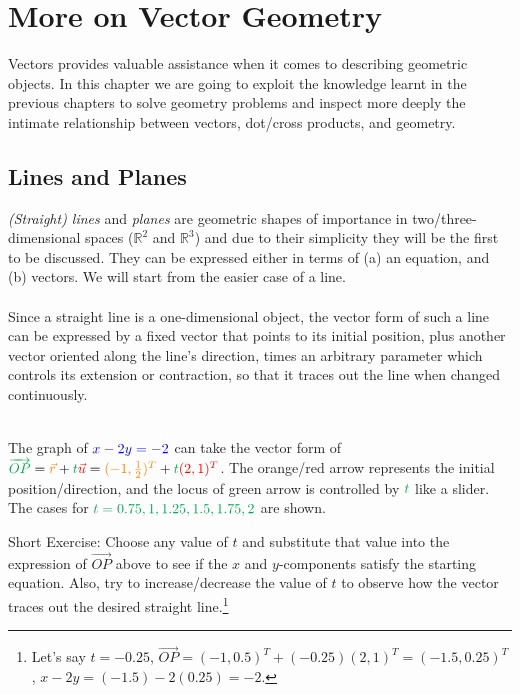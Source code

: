 \chapter{More on Vector Geometry}

Vectors provides valuable assistance when it comes to describing geometric objects. In this chapter we are going to exploit the knowledge learnt in the previous chapters to solve geometry problems and inspect more deeply the intimate relationship between vectors, dot/cross products, and geometry.

\section{Lines and Planes}
\textit{(Straight) lines} and \textit{planes} are geometric shapes of importance in two/three-dimensional spaces ($\mathbb{R}^2$ and $\mathbb{R}^3$) and due to their simplicity they will be the first to be discussed. They can be expressed either in terms of (a) an equation, and (b) vectors. We will start from the easier case of a line.\\
\\
Since a straight line is a one-dimensional object, the vector form of such a line can be expressed by a fixed vector that points to its initial position, plus another vector oriented along the line's direction, times an arbitrary parameter which controls its extension or contraction, so that it traces out the line when changed continuously.
\begin{center}
\\
The graph of $\color{blue}x - 2y = -2$ can take the vector form of ${\color{Green}\overrightarrow{OP}} = {\color{orange}\vec{r}} + {\color{Green}t} {\color{red}\vec{u}} = {\color{orange}(-1,\frac{1}{2})^T} + {\color{Green}t}{\color{red}(2,1)^T}$. The orange/red arrow represents the initial position/direction, and the locus of green arrow is controlled by $\color{Green}t$ like a slider. The cases for $\color{Green}t = 0.75, 1, 1.25, 1.5, 1.75, 2$ are shown.
\end{center}
Short Exercise: Choose any value of $t$ and substitute that value into the expression of $\overrightarrow{OP}$ above to see if the $x$ and $y$-components satisfy the starting equation. Also, try to increase/decrease the value of $t$ to observe how the vector traces out the desired straight line.\footnote{Let's say $t = -0.25$, $\overrightarrow{OP}=(-1,0.5)^T + (-0.25)(2,1)^T = (-1.5, 0.25)^T$, $x - 2y = (-1.5) - 2(0.25) = -2$.}

